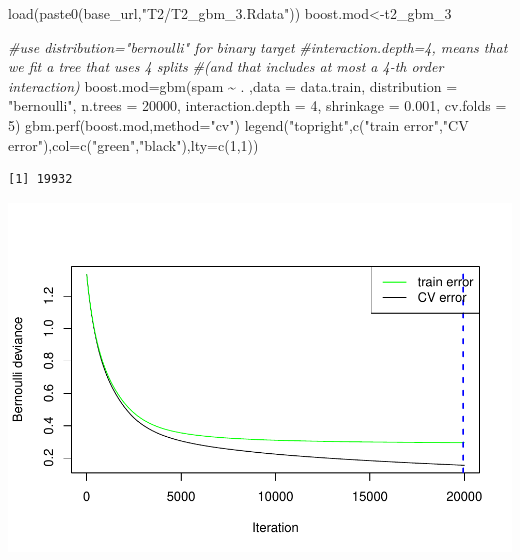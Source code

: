 \documentclass[
  11pt,
]{article}
\newenvironment{Shaded}{\begin{snugshade}}{\end{snugshade}}
\newcommand{\AttributeTok}[1]{\textcolor[rgb]{0.77,0.63,0.00}{#1}}
\newcommand{\CommentTok}[1]{\textcolor[rgb]{0.56,0.35,0.01}{\textit{#1}}}
\newcommand{\DecValTok}[1]{\textcolor[rgb]{0.00,0.00,0.81}{#1}}
\newcommand{\FloatTok}[1]{\textcolor[rgb]{0.00,0.00,0.81}{#1}}
\newcommand{\FunctionTok}[1]{\textcolor[rgb]{0.00,0.00,0.00}{#1}}
\newcommand{\NormalTok}[1]{#1}
\newcommand{\OtherTok}[1]{\textcolor[rgb]{0.56,0.35,0.01}{#1}}
\newcommand{\SpecialCharTok}[1]{\textcolor[rgb]{0.00,0.00,0.00}{#1}}
\newcommand{\StringTok}[1]{\textcolor[rgb]{0.31,0.60,0.02}{#1}}
\begin{document}
\begin{Shaded}
\begin{Highlighting}[]
\FunctionTok{load}\NormalTok{(}\FunctionTok{paste0}\NormalTok{(base\_url,}\StringTok{"T2/T2\_gbm\_3.Rdata"}\NormalTok{))}
\NormalTok{boost.mod}\OtherTok{\textless{}{-}}\NormalTok{t2\_gbm\_3}
\end{Highlighting}
\end{Shaded}

\begin{Shaded}
\begin{Highlighting}[]
\CommentTok{\#use distribution="bernoulli" for binary target}
\CommentTok{\#interaction.depth=4, means that we fit a tree that uses 4 splits }
\CommentTok{\#(and that includes at most a 4{-}th order interaction)}
\NormalTok{boost.mod}\OtherTok{=}\FunctionTok{gbm}\NormalTok{(spam }\SpecialCharTok{\textasciitilde{}}\NormalTok{ . ,}\AttributeTok{data =}\NormalTok{ data.train, }\AttributeTok{distribution =} \StringTok{"bernoulli"}\NormalTok{, }
              \AttributeTok{n.trees =} \DecValTok{20000}\NormalTok{, }\AttributeTok{interaction.depth =} \DecValTok{4}\NormalTok{, }\AttributeTok{shrinkage =} \FloatTok{0.001}\NormalTok{, }\AttributeTok{cv.folds =} \DecValTok{5}\NormalTok{)}
\FunctionTok{gbm.perf}\NormalTok{(boost.mod,}\AttributeTok{method=}\StringTok{"cv"}\NormalTok{)}
\FunctionTok{legend}\NormalTok{(}\StringTok{"topright"}\NormalTok{,}\FunctionTok{c}\NormalTok{(}\StringTok{"train error"}\NormalTok{,}\StringTok{"CV error"}\NormalTok{),}\AttributeTok{col=}\FunctionTok{c}\NormalTok{(}\StringTok{"green"}\NormalTok{,}\StringTok{"black"}\NormalTok{),}\AttributeTok{lty=}\FunctionTok{c}\NormalTok{(}\DecValTok{1}\NormalTok{,}\DecValTok{1}\NormalTok{))}
\end{Highlighting}
\end{Shaded}

\begin{verbatim}
[1] 19932
\end{verbatim}

\includegraphics{report_files/figure-latex/Task_2_23Y3-1.pdf}
\end{document}
